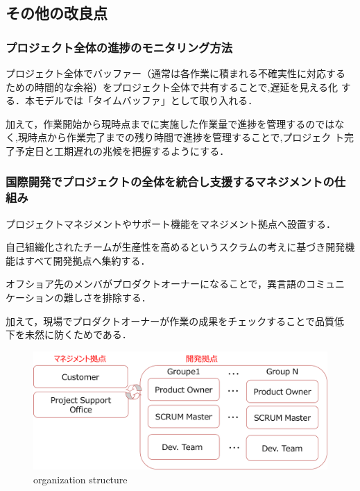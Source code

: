 \documentclass[a4j, 12Q, twocolumn, twoside]{jsarticle}
\begin{document}
\subsection{その他の改良点}

\subsubsection{プロジェクト全体の進捗のモニタリング方法}
プロジェクト全体でバッファー（通常は各作業に積まれる不確実性に対応する
ための時間的な余裕）をプロジェクト全体で共有することで,遅延を見える化
する．本モデルでは「タイムバッファ」として取り入れる．

加えて，作業開始から現時点までに実施した作業量で進捗を管理するのではな
く,現時点から作業完了までの残り時間で進捗を管理することで,プロジェク
ト完了予定日と工期遅れの兆候を把握するようにする．

\subsubsection{国際開発でプロジェクトの全体を統合し支援するマネジメントの仕組み}
プロジェクトマネジメントやサポート機能をマネジメント拠点へ設置する．

自己組織化されたチームが生産性を高めるというスクラムの考えに基づき開発機
能はすべて開発拠点へ集約する．

オフショア先のメンバがプロダクトオーナーになることで，異言語のコミュニ
ケーションの難しさを排除する．

加えて，現場でプロダクトオーナーが作業の成果をチェックすることで品質低
下を未然に防くためである．

\begin{figure}[htb]
  \begin{center}
    \includegraphics[width=\columnwidth]{./figures/organization_model.png}
    \caption{organization structure}
  \end{center}
\end{figure}
\end{document}
